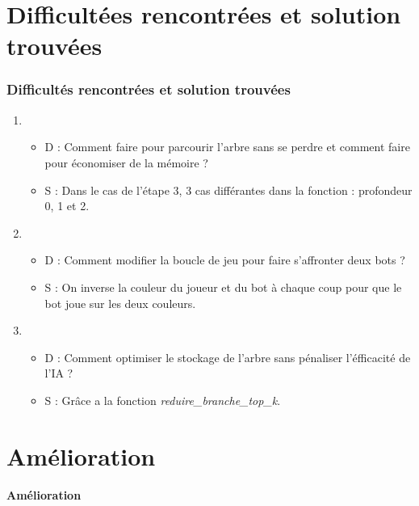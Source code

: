\documentclass[9pt]{beamer}
\begin{document}
\section{Difficultées rencontrées et solution trouvées}
\begin{frame}
  \frametitle{Difficultés rencontrées et solution trouvées}
  \begin{enumerate}
    \item
    \begin{itemize}
      \item D : Comment faire pour parcourir l'arbre sans se perdre et comment faire pour économiser de la mémoire ?
      \item S : Dans le cas de l'étape 3, 3 cas différantes dans la fonction : profondeur 0, 1 et 2.   
    \end{itemize}
    \item
    \begin{itemize}
      \item D : Comment modifier la boucle de jeu pour faire s'affronter deux bots ?
      \item S : On inverse la couleur du joueur et du bot à chaque coup pour que le bot joue sur les deux couleurs.
    \end{itemize}
    \item
    \begin{itemize}
      \item D : Comment optimiser le stockage de l'arbre sans pénaliser l'éfficacité de l'IA ?
      \item S : Grâce a la fonction \textit{reduire\_branche\_top\_k}.
    \end{itemize}
  \end{enumerate}
\end{frame}

\section{Amélioration}
\begin{frame}
  \begin{center}
      \Large \textbf{Amélioration}
  \end{center}
\end{frame}
\end{document}
